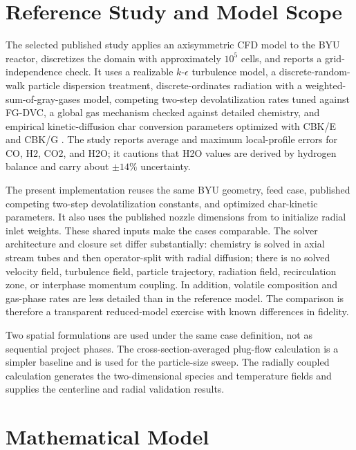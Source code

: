 \documentclass[journal]{IEEEtran}
\begin{document}
\section{Reference Study and Model Scope}
The selected published study applies an axisymmetric CFD model to the BYU reactor, discretizes the domain with approximately \(10^5\) cells, and reports a grid-independence check. It uses a realizable \(k\)-\(\epsilon\) turbulence model, a discrete-random-walk particle dispersion treatment, discrete-ordinates radiation with a weighted-sum-of-gray-gases model, competing two-step devolatilization rates tuned against FG-DVC, a global gas mechanism checked against detailed chemistry, and empirical kinetic-diffusion char conversion parameters optimized with CBK/E and CBK/G \cite{mularski2021}. The study reports average and maximum local-profile errors for CO, H2, CO2, and H2O; it cautions that H2O values are derived by hydrogen balance and carry about \(\pm14\%\) uncertainty.

The present implementation reuses the same BYU geometry, feed case, published competing two-step devolatilization constants, and optimized char-kinetic parameters. It also uses the published nozzle dimensions from \cite{abani2013} to initialize radial inlet weights. These shared inputs make the cases comparable. The solver architecture and closure set differ substantially: chemistry is solved in axial stream tubes and then operator-split with radial diffusion; there is no solved velocity field, turbulence field, particle trajectory, radiation field, recirculation zone, or interphase momentum coupling. In addition, volatile composition and gas-phase rates are less detailed than in the reference model. The comparison is therefore a transparent reduced-model exercise with known differences in fidelity.

Two spatial formulations are used under the same case definition, not as sequential project phases. The cross-section-averaged plug-flow calculation is a simpler baseline and is used for the particle-size sweep. The radially coupled calculation generates the two-dimensional species and temperature fields and supplies the centerline and radial validation results.

\section{Mathematical Model}
\end{document}
